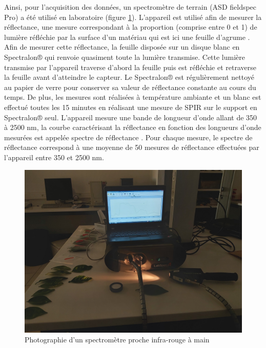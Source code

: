 \documentclass[
  11pt,
  french,
  a4paper,
  extrafontsizes,onecolumn,openright
  ]{memoir}
\begin{document}
\normalsize

Ainsi, pour l'acquisition des données, un spectromètre de terrain (ASD fieldspec Pro) a été utilisé en laboratoire (figure \ref{fig:9}). L'appareil est utilisé afin de mesurer la réflectance, une mesure correspondant à la proportion (comprise entre 0 et 1) de lumière réfléchie par la surface d'un matériau qui est ici une feuille d'agrume \autocite{comar_etude_2013}.
Afin de mesurer cette réflectance, la feuille disposée sur un disque blanc en Spectralon® qui renvoie quasiment toute la lumière transmise. Cette lumière transmise par l'appareil traverse d'abord la feuille puis est réfléchie et retraverse la feuille avant d'atteindre le capteur. Le Spectralon® est régulièrement nettoyé au papier de verre pour conserver sa valeur de réflectance constante au cours du temps. De plus, les mesures sont réalisées à température ambiante et un blanc est effectué toutes les 15 minutes en réalisant une mesure de SPIR sur le support en Spectralon® seul. L'appareil mesure une bande de longueur d'onde allant de 350 à 2500 nm, la courbe caractérisant la réflectance en fonction des longueurs d'onde mesurées est appelée spectre de réflectance \autocite{comar_etude_2013}.
Pour chaque mesure, le spectre de réflectance correspond à une moyenne de 50 mesures de réflectance effectuées par l'appareil entre 350 et 2500 nm.

\scriptsize

\begin{figure}

{\centering \includegraphics[width=0.8\linewidth]{Images/Figure9} 

}

\caption{Photographie d’un spectromètre proche infra-rouge à main}\label{fig:9}
\end{figure}
\end{document}
